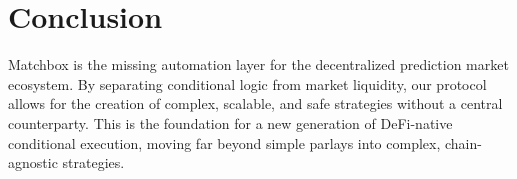 \documentclass[11pt, a4paper]{article}
\begin{document}
\section{Conclusion}
Matchbox is the missing automation layer for the decentralized prediction market ecosystem. By separating conditional logic from market liquidity, our protocol allows for the creation of complex, scalable, and safe strategies without a central counterparty. This is the foundation for a new generation of DeFi-native conditional execution, moving far beyond simple parlays into complex, chain-agnostic strategies.
\end{document}
